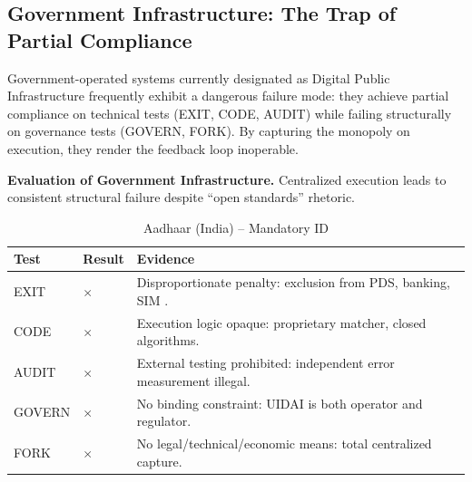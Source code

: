 \documentclass{article}
\begin{document}
\subsection{Government Infrastructure: The Trap of Partial Compliance}

Government-operated systems currently designated as Digital Public Infrastructure frequently exhibit a dangerous failure mode: they achieve partial compliance on technical tests (EXIT, CODE, AUDIT) while failing structurally on governance tests (GOVERN, FORK). By capturing the monopoly on execution, they render the feedback loop inoperable.

\begin{table}[htbp]
    \centering
    \caption{\textbf{Evaluation of Government Infrastructure.} Centralized execution leads to consistent structural failure despite ``open standards'' rhetoric.}
    \label{tab:govt_infra}

    \begin{subtable}{1\textwidth}
        \centering
        \caption{Aadhaar (India) -- Mandatory ID}
        \small
        \begin{tabular}{@{}llp{8.5cm}@{}}
            \toprule
            \textbf{Test} & \textbf{Result} & \textbf{Evidence} \\
            \midrule
            EXIT & $\times$ & Disproportionate penalty: exclusion from PDS, banking, SIM \citep{khera2019}. \\
            CODE & $\times$ & Execution logic opaque: proprietary matcher, closed algorithms. \\
            AUDIT & $\times$ & External testing prohibited: independent error measurement illegal. \\
            GOVERN & $\times$ & No binding constraint: UIDAI is both operator and regulator. \\
            FORK & $\times$ & No legal/technical/economic means: total centralized capture. \\
            \bottomrule
        \end{tabular}
        \vspace{0.3cm}
    \end{subtable}


\end{table}
\end{document}
